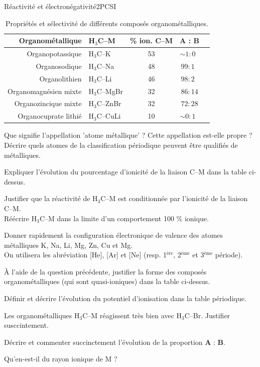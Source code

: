 \begin{exercise}{Réactivité et électronégativité}{2}{PCSI}
\begin{questions}
\begin{EnvUplevel}
\begin{table}[H]
    \centering
    \begin{tabular}{rlccr}
        Organométallique & H$_3$C--M  & \% ion. C--M & \textbf{A} : \textbf{B} \\ \hline\hline
        Organopotassique      & H$_3$C--K    & 53 & $\sim 1:0$~ \\
        Organosodique         & H$_3$C--Na   & 48 & $99:1$~ \\
        Organolithien         & H$_3$C--Li   & 46 & $98:2$~ \\
        Organomagnésien mixte & H$_3$C--MgBr & 32 & $86:14$ \\
        Organozincique mixte  & H$_3$C--ZnBr & 32 & $72:28$ \\
        Organocuprate lithié  & H$_3$C--CuLi & 10 & $\sim 0:1$~ \\ \hline
    \end{tabular}
    \caption{Propriétés et sélectivité de différents composés organométalliques.}
\end{table}
\end{EnvUplevel}

\question Que signifie l'appellation 'atome métallique' ? Cette appellation est-elle propre ? Décrire quels atomes de la classification périodique peuvent être qualifiés de métalliques.

\question Expliquer l'évolution du pourcentage d'ionicité de la liaison C--M dans la table ci-dessus.

\question Justifier que la réactivité de H$_3$C--M est conditionnée par l'ionicité de la liaison C--M. \\
Réécrire H$_3$C--M dans la limite d'un comportement 100 \% ionique.

\question Donner rapidement la configuration électronique de valence des atomes métalliques K, Na, Li, Mg, Zn, Cu et Mg. \\
On utilisera les abréviation [He], [Ar] et [Ne] (resp. 1$^\text{ère}$, 2$^\text{ème}$ et 3$^\text{ème}$ période).

\question À l'aide de la question précédente, justifier la forme des composés organométalliques (qui sont quasi-ioniques) dans la table ci-dessus.

\question Définir et décrire l'évolution du potentiel d'ionisation dans la table périodique.

\question Les organométalliques H$_3$C--M réagissent très bien avec H$_3$C--Br. Justifier susccintement.

\question Décrire et commenter succinctement l'évolution de la proportion \textbf{A} : \textbf{B}.

\question Qu'en-est-il du rayon ionique de M ?

\end{questions}

\end{exercise}